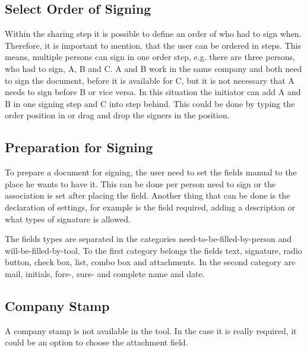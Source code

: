 \subsection{Select Order of Signing}
Within the sharing step it is possible to define an order of who had to sign when. Therefore, it is important to mention, that the user can be ordered in steps. This means, multiple persons can sign in one order step, e.g. there are three persons, who had to sign, A, B and C. A and B work in the same company and both need to sign the document, before it is available for C, but it is not necessary that A needs to sign before B or vice versa. In this situation the initiator can add A and B in one signing step and C into step behind. This could be done by typing the order position in or drag and drop the signers in the position. 

\subsection{Preparation for Signing}
To prepare a document for signing, the user need to set the fields manual to the place he wants to have it. This can be done per person need to sign or the association is set after placing the field. Another thing that can be done is the declaration of settings, for example is the field required, adding a description or what types of signature is allowed.

The fields types are separated in the categories need-to-be-filled-by-person and will-be-filled-by-tool. To the first category belongs the fields text, signature, radio button, check box, list, combo box and attachments. In the second category are mail, initials, fore-, sure- and complete name and date.

\subsection{Company Stamp}
A company stamp is not available in the tool. In the case it is really required, it could be an option to choose the attachment field.
 
